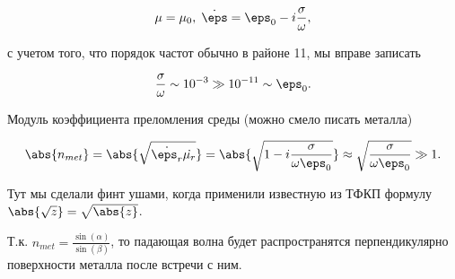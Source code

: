 $$\mu=\mu_0, \; \dot{\eps}=\eps_0-i\frac{\sigma}{\omega}, $$

с учетом того, что порядок частот обычно в районе 11, мы вправе записать

$$\frac{\sigma}{\omega} \sim 10^{-3} \gg 10^{-11} \sim \eps_0. $$

Модуль коэффициента преломления среды (можно смело писать металла)

$$\abs{n_{met}}=\abs{\sqrt{\dot{\eps_r}\dot{\mu_r}}}=\abs{\sqrt{1-i\frac{\sigma}{\omega\eps_0}}} \approx 
\sqrt{\frac{\sigma}{\omega\eps_0}} \gg 1.$$

Тут мы сделали финт ушами, когда применили известную из ТФКП формулу $\abs{\sqrt{z}}=\sqrt{\abs{z}}$.

Т.к. $n_{met}=\frac{\sin(\alpha)}{\sin(\beta)}$, то падающая волна будет распространятся перпендикулярно
поверхности металла после встречи с ним.
